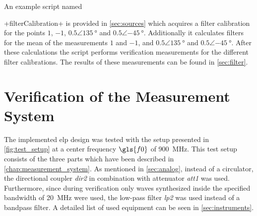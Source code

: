 \documentclass[12pt,a4paper,parskip=full,abstract=true,BCOR=12mm]{scrreprt}
\newcommand*{\SavedLstInline}{}
\DeclareRobustCommand*{\lstinline}{%
  \ifmmode
    \let\SavedBGroup\bgroup
    \def\bgroup{%
      \let\bgroup\SavedBGroup
      \hbox\bgroup
    }%
  \fi
  \SavedLstInline
}
\def\device#1{\mbox{\textit{#1}}}
\begin{document}
An example script named \lstinline+filterCalibration+ is provided in
\cref{sec:sources} which acquires a filter calibration for the points
$1$, $-1$, $0.5\angle\SI{135}{\degree}$ and $0.5\angle\SI{-45}{\degree}$.
Additionally it calculates filters for the mean of the measurements $1$ and $-1$,
and $0.5\angle\SI{135}{\degree}$ and $0.5\angle\SI{-45}{\degree}$. After these
calculations the script performs verification measurements for the different
filter calibrations. The results of these measurements can be found in \cref{sec:filter}.


\chapter{Verification of the Measurement System}
\label{chap:verification}
\lstset{language=matlab}

The implemented \gls{elp} design was tested with the setup presented in
\cref{fig:test_setup} at a center frequency $\gls{f0}$ of \SI{900}{\mega\hertz}. This test setup consists of the three parts
which have been described in \cref{chap:measurement_system}. As mentioned in
\cref{sec:analog}, instead of a circulator, the directional coupler
\device{dir2} in combination with attenuator \device{att1} was used.
Furthermore, since during verification only waves synthesized inside
the specified bandwidth of \SI{20}{\mega\hertz} were used, the low-pass filter \device{lp2}
was used instead of a bandpass filter. A detailed list of used
equipment can be seen in \cref{sec:instruments}.
\end{document}
